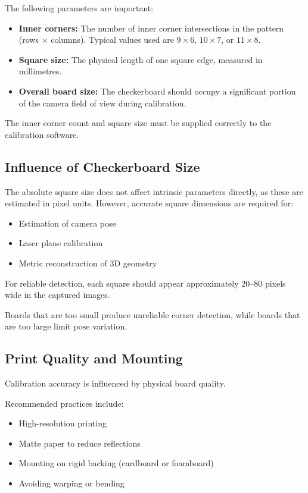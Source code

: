 \documentclass[11pt,a4paper]{article}
\begin{document}
The following parameters are important:

\begin{itemize}
  \item \textbf{Inner corners:} The number of inner corner intersections in the pattern (rows $\times$ columns).
  Typical values used are $9\times6$, $10\times7$, or $11\times8$.
  \item \textbf{Square size:} The physical length of one square edge, measured in millimetres.
  \item \textbf{Overall board size:} The checkerboard should occupy a significant portion of the camera field of view during calibration.
\end{itemize}

The inner corner count and square size must be supplied correctly to the calibration software.

\subsection{Influence of Checkerboard Size}

The absolute square size does not affect intrinsic parameters directly, as these are estimated in pixel units. However, accurate square dimensions are required for:

\begin{itemize}
  \item Estimation of camera pose
  \item Laser plane calibration
  \item Metric reconstruction of 3D geometry
\end{itemize}

For reliable detection, each square should appear approximately 20--80 pixels wide in the captured images.

Boards that are too small produce unreliable corner detection, while boards that are too large limit pose variation.

\subsection{Print Quality and Mounting}

Calibration accuracy is influenced by physical board quality.

Recommended practices include:

\begin{itemize}
  \item High-resolution printing
  \item Matte paper to reduce reflections
  \item Mounting on rigid backing (cardboard or foamboard)
  \item Avoiding warping or bending
\end{itemize}
\end{document}
